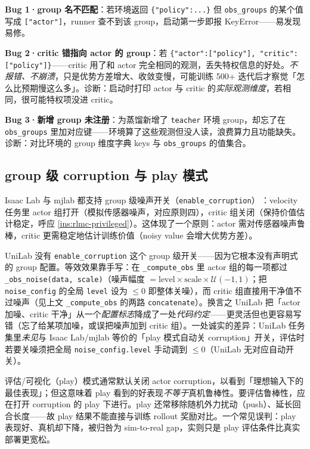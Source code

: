 \begin{pitfall}
\textbf{Bug 1·group 名不匹配}：若环境返回 \verb|{"policy":...}| 但 \verb|obs_groups| 的某个值写成 \verb|["actor"]|，runner 查不到该 group，启动第一步即报 KeyError——易发现易修。

\textbf{Bug 2·critic 错指向 actor 的 group}：若 \verb|{"actor":["policy"], "critic":["policy"]}|——critic 用了和 actor 完全相同的观测，丢失特权信息的好处。\emph{不报错、不崩溃}，只是优势方差增大、收敛变慢，可能训练 500+ 迭代后才察觉「怎么比预期慢这么多」。诊断：启动时打印 actor 与 critic 的\emph{实际观测维度}，若相同，很可能特权项没进 critic。

\textbf{Bug 3·新增 group 未注册}：为蒸馏新增了 \verb|teacher| 环境 group，却忘了在 \verb|obs_groups| 里加对应键——环境算了这些观测但没人读，浪费算力且功能缺失。诊断：对比环境的 group 维度字典 keys 与 \verb|obs_groups| 的值集合。
\end{pitfall}

\subsection{group 级 corruption 与 play 模式}
\label{sec:rlmc-corruption}

Isaac Lab 与 mjlab 都支持 group 级噪声开关（\verb|enable_corruption|）\,\cite{isaaclab2024,mjlab2026}：velocity 任务里 actor 组打开（模拟传感器噪声，对应原则四），critic 组关闭（保持价值估计稳定，呼应 \cref{ins:rlmc-privileged}）。这体现了一个原则：actor 需对传感器噪声鲁棒，critic 更需稳定地估计训练价值（noisy value 会增大优势方差）。

UniLab 没有 \verb|enable_corruption| 这个 group 级开关——因为它根本没有声明式的 group 配置。等效效果靠手写：在 \verb|_compute_obs| 里 actor 组的每一项都过 \verb|_obs_noise(data, scale)|（噪声幅度 $=\text{level}\times\text{scale}\times\mathcal U(-1,1)$；把 \verb|noise_config| 的全局 \verb|level| 设为 $\le 0$ 即整体关噪），而 critic 组直接用干净值不过噪声（见上文 \verb|_compute_obs| 的两路 \verb|concatenate|）。换言之 UniLab 把「actor 加噪、critic 干净」从一个\emph{配置标志}降成了一处\emph{代码约定}——更灵活但也更容易写错（忘了给某项加噪，或误把噪声加到 critic 组）。一处诚实的差异：UniLab 任务集里\emph{未见}与 Isaac Lab/mjlab 等价的「play 模式自动关 corruption」开关，评估时若要关噪须把全局 \verb|noise_config.level| 手动调到 $\le 0$（UniLab 无对应自动开关）。

\begin{pitfall}
评估/可视化（play）模式通常默认关闭 actor corruption，以看到「理想输入下的最佳表现」；但这意味着 play 看到的好表现\emph{不等于}真机鲁棒性。要评估鲁棒性，应在打开 corruption 的 play 下进行。play 还常移除随机外力扰动（push）、延长回合长度——故 play 结果不能直接与训练 rollout 奖励对比。一个常见误判：play 表现好、真机却下降，被归咎为 sim-to-real gap，实则只是 play 评估条件比真实部署更宽松。
\end{pitfall}

